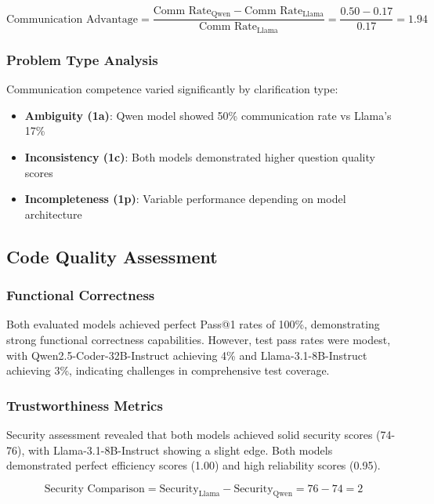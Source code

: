 \documentclass[conference]{IEEEtran}
\begin{document}
\begin{equation}
\text{Communication Advantage} = \frac{\text{Comm Rate}_{\text{Qwen}} - \text{Comm Rate}_{\text{Llama}}}{\text{Comm Rate}_{\text{Llama}}} = \frac{0.50 - 0.17}{0.17} = 1.94
\end{equation}

\subsubsection{Problem Type Analysis}

Communication competence varied significantly by clarification type:

\begin{itemize}
    \item \textbf{Ambiguity (1a)}: Qwen model showed 50\% communication rate vs Llama's 17\%
    \item \textbf{Inconsistency (1c)}: Both models demonstrated higher question quality scores
    \item \textbf{Incompleteness (1p)}: Variable performance depending on model architecture
\end{itemize}

\subsection{Code Quality Assessment}

\subsubsection{Functional Correctness}

Both evaluated models achieved perfect Pass@1 rates of 100\%, demonstrating strong functional correctness capabilities. However, test pass rates were modest, with Qwen2.5-Coder-32B-Instruct achieving 4\% and Llama-3.1-8B-Instruct achieving 3\%, indicating challenges in comprehensive test coverage.

\subsubsection{Trustworthiness Metrics}

Security assessment revealed that both models achieved solid security scores (74-76), with Llama-3.1-8B-Instruct showing a slight edge. Both models demonstrated perfect efficiency scores (1.00) and high reliability scores (0.95).

\begin{equation}
\text{Security Comparison} = \text{Security}_{\text{Llama}} - \text{Security}_{\text{Qwen}} = 76 - 74 = 2
\end{equation}
\end{document}
